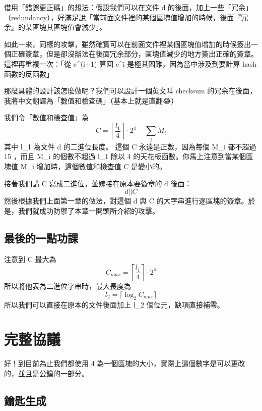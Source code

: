 \documentclass[
]{article}
\begin{document}
借用「錯誤更正碼」的想法：假設我們可以在文件 d
的後面，加上一些「冗余」（redundancy），好滿足說「當前面文件裡的某個區塊值增加的時候，後面『冗余』的某區塊其區塊值會減少」。

如此一來，同樣的攻擊，雖然確實可以在前面文件裡某個區塊值增加的時候簽出一個正確簽章，但是卻沒辦法在後面冗余部分，區塊值減少的地方簽出正確的簽章。這裡再重複一次：「從
c\^{}(i+1) 算回 c\^{}i 是極其困難，因為當中涉及到要計算 hash
函數的反函數」

那麼具體的設計該怎麼做呢？我們可以設計一個英文叫 checksum
的冗余在後面，我將中文翻譯為「數值和檢查碼」（基本上就是直翻😂）

我們令「數值和檢查值」為 \[
C = \left\lceil \frac{l_{1}}{4} \right  \rceil  \cdot 2^{4} - \sum_{i} M_{i}
\] 其中 l\_1 為文件 d 的二進位長度。 這個 C 永遠是正數，因為每個 M\_i
都不超過 15 ，而且 M\_i 的個數不超過 l\_1 除以 4
的天花板函數。你馬上注意到當某個區塊值 M\_i 增加時，這個數值和檢查值 C
是變小的。

接著我們講 C 寫成二進位，並嫁接在原本要簽章的 d 後面： \[
d || C
\] 然後根據我們上面第一章的做法，對這個 d 與 C
的大字串進行逐區塊的簽章。於是，我們就成功防禦了本章一開頭所介紹的攻擊。

\hypertarget{ux6700ux5f8cux7684ux4e00ux9edeux529fux8ab2}{%
\subsection{最後的一點功課}\label{ux6700ux5f8cux7684ux4e00ux9edeux529fux8ab2}}

注意到 C 最大為 \[
C_{max}
=\left\lceil \frac{l_{1}}{4} \right  \rceil  \cdot 2^{4} 
\] 所以將他表為二進位字串時，最大長度為 \[
l_{2} = \lceil \log_{2}C_{max} \rceil 
\] 所以我們可以直接在原本的文件後面加上 l\_2 個位元，缺項直接補零。

\hypertarget{ux5b8cux6574ux5354ux8b70}{%
\section{完整協議}\label{ux5b8cux6574ux5354ux8b70}}

好！到目前為止我們都使用 4
為一個區塊的大小，實際上這個數字是可以更改的，並且是公鑰的一部分。

\hypertarget{ux9470ux5319ux751fux6210}{%
\subsection{鑰匙生成}\label{ux9470ux5319ux751fux6210}}
\end{document}
